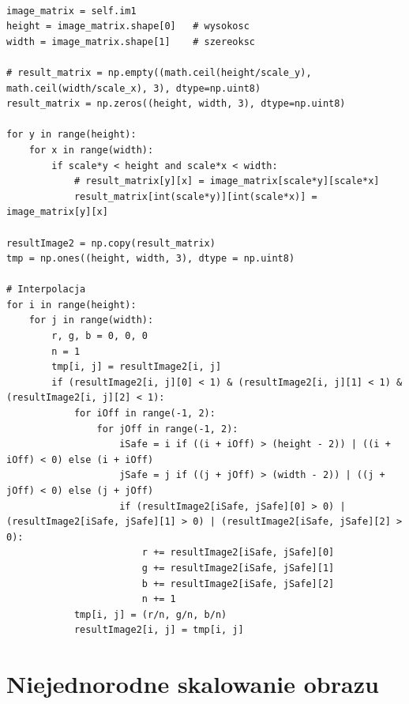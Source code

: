 \documentclass[final,a4paper,openany,12pt]{mwbk}
\begin{document}
\begin{lstlisting}[caption= Jednorodne skalowanie obrazu]

image_matrix = self.im1
height = image_matrix.shape[0]   # wysokosc
width = image_matrix.shape[1]    # szereoksc

# result_matrix = np.empty((math.ceil(height/scale_y), math.ceil(width/scale_x), 3), dtype=np.uint8)
result_matrix = np.zeros((height, width, 3), dtype=np.uint8)

for y in range(height):
    for x in range(width): 
        if scale*y < height and scale*x < width:
            # result_matrix[y][x] = image_matrix[scale*y][scale*x]
            result_matrix[int(scale*y)][int(scale*x)] = image_matrix[y][x]

resultImage2 = np.copy(result_matrix)
tmp = np.ones((height, width, 3), dtype = np.uint8)

# Interpolacja
for i in range(height):
    for j in range(width):
        r, g, b = 0, 0, 0
        n = 1
        tmp[i, j] = resultImage2[i, j]
        if (resultImage2[i, j][0] < 1) & (resultImage2[i, j][1] < 1) & (resultImage2[i, j][2] < 1):
            for iOff in range(-1, 2):
                for jOff in range(-1, 2):
                    iSafe = i if ((i + iOff) > (height - 2)) | ((i + iOff) < 0) else (i + iOff)
                    jSafe = j if ((j + jOff) > (width - 2)) | ((j + jOff) < 0) else (j + jOff)
                    if (resultImage2[iSafe, jSafe][0] > 0) | (resultImage2[iSafe, jSafe][1] > 0) | (resultImage2[iSafe, jSafe][2] > 0):
                        r += resultImage2[iSafe, jSafe][0]
                        g += resultImage2[iSafe, jSafe][1]
                        b += resultImage2[iSafe, jSafe][2]
                        n += 1
            tmp[i, j] = (r/n, g/n, b/n)
            resultImage2[i, j] = tmp[i, j]

\end{lstlisting}

\section{ Niejednorodne skalowanie obrazu}

\hfill
\\\\
\indent
\end{document}
